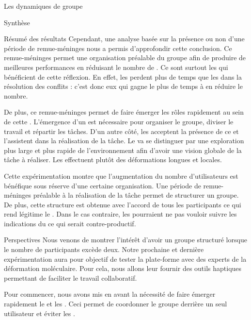 \documentclass[myfrancais]{mythesis}
\begin{document}
\begin{mychapter}{Les dynamiques de groupe}
\begin{mysection}{Synthèse}
\begin{mysubsection}{Résumé des résultats}
				Cependant, une analyse basée sur la présence ou non d'une période de remue-méninges nous a permis d'approfondir cette conclusion.
				Ce remue-méninges permet une organisation préalable du groupe afin de produire de meilleures performances en réduisant le nombre de .
				Ce sont surtout les  qui bénéficient de cette réflexion.
				En effet, les  perdent plus de temps que les  dans la résolution des conflits : c'est donc eux qui gagne le plus de temps à en réduire le nombre.

				De plus, ce remue-méninges permet de faire émerger les rôles rapidement au sein de cette .
				L'émergence d'un  est nécessaire pour organiser le groupe, diviser le travail et répartir les tâches.
				D'un autre côté, les  acceptent la présence de ce  et l'assistent dans la réalisation de la tâche.
				Le  va se distinguer par une exploration plus large et plus rapide de l'environnement afin d'avoir une vision globale de la tâche à réaliser.
				Les  effectuent plutôt des déformations longues et locales.

				Cette expérimentation montre que l'augmentation du nombre d'utilisateurs est bénéfique sous réserve d'une certaine organisation.
				Une période de remue-méninges préalable à la réalisation de la tâche permet de structurer un groupe.
				De plus, cette structure est obtenue avec l'accord de tous les participants ce qui rend légitime le .
				Dans le cas contraire, les  pourraient ne pas vouloir suivre les indications du  ce qui serait contre-productif.
			\end{mysubsection}
			\begin{mysubsection}{Perspectives}
				Nous venons de montrer l'intérêt d'avoir un groupe structuré lorsque le nombre de participants excède deux.
				Notre prochaine et dernière expérimentation aura pour objectif de tester la plate-forme avec des experts de la déformation moléculaire.
				Pour cela, nous allons leur fournir des outils haptiques permettant de faciliter le travail collaboratif.

				Pour commencer, nous avons mis en avant la nécessité de faire émerger rapidement le  et les .
				Ceci permet de coordonner le groupe derrière un seul utilisateur et éviter les .


\end{mysubsection}
\end{mysection}
\end{mychapter}
\end{document}
